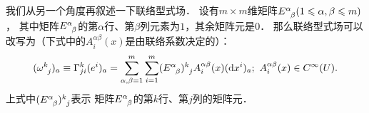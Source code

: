 我们从另一个角度再叙述一下联络型式场．
设有$m\times m$维矩阵$E^\alpha_{\hphantom{\alpha} \beta}(1\leqslant \alpha,\beta \leqslant m)$，
其中矩阵$E^\alpha_{\hphantom{\alpha} \beta}$的第$\alpha$行、第$\beta$列元素为$1$，其余矩阵元是$0$．
那么联络型式场可以改写为（下式中的$A^{\alpha\beta}_i(x)$是由联络系数决定的）：
\begin{equation}\label{chccr:def_1form-gauge}
	(\omega_{\hphantom{k} j}^{k})_a \equiv \Gamma_{ji}^k (e^i)_a
	=\sum_{\alpha,\beta=1}^{m} \sum_{i=1}^{m} 
	(E^\alpha_{\hphantom{\alpha} \beta})_{\hphantom{k}j}^k
	A^{\alpha\beta}_i(x) ({\rm d}x^i)_a;
    \ A^{\alpha\beta}_i(x)\in C^{\infty}(U).
\end{equation}
上式中$(E^\alpha_{\hphantom{\alpha} \beta})_{\hphantom{k}j}^k$表示
矩阵$E^\alpha_{\hphantom{\alpha} \beta}$的第$k$行、第$j$列的矩阵元．

